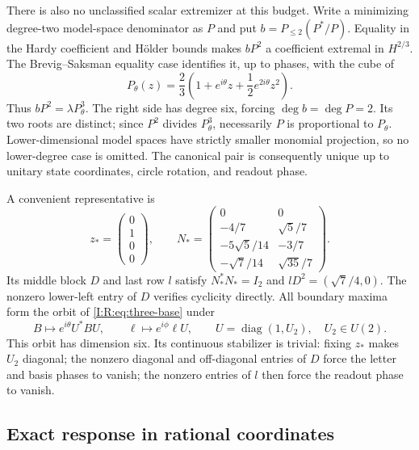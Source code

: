 There is also no unclassified scalar extremizer at this budget.
Write a minimizing degree-two model-space denominator as $P$ and put
$b=P_{\le2}(P^*/P)$.  Equality in the Hardy coefficient and H\"older
bounds makes $bP^2$ a coefficient extremal in $H^{2/3}$.
The Brevig--Saksman equality case identifies it, up to phases, with the
cube of
\[
 P_\theta(z)=\frac23\left(1+e^{i\theta}z+
                 \frac12 e^{2i\theta}z^2\right).
\]
Thus $bP^2=\lambda P_\theta^3$.
The right side has degree six, forcing $\deg b=\deg P=2$.
Its two roots are distinct; since $P^2$ divides $P_\theta^3$, necessarily
$P$ is proportional to $P_\theta$.
Lower-dimensional model spaces have strictly smaller monomial projection,
so no lower-degree case is omitted.
The canonical pair is consequently unique up to unitary state coordinates,
circle rotation, and readout phase.

A convenient representative is
\begin{equation}
 z_*=\begin{pmatrix}0\\1\\0\\0\end{pmatrix},\qquad
 N_*=
 \begin{pmatrix}
 0&0\\
 -4/7&\sqrt5/7\\
 -5\sqrt5/14&-3/7\\
 -\sqrt7/14&\sqrt{35}/7
 \end{pmatrix}.
 \label{I:R:eq:three-base}
\end{equation}
Its middle block $D$ and last row $l$ satisfy
$N_*^*N_*=I_2$ and $lD^2=(\sqrt7/4,0)$.
The nonzero lower-left entry of $D$ verifies cyclicity directly.
All boundary maxima form the orbit of \eqref{I:R:eq:three-base} under
\[
 B\mapsto e^{i\theta}U^*BU,\qquad
 \ell\mapsto e^{i\phi}\ell U,\qquad
 U=\operatorname{diag}(1,U_2),\quad U_2\in U(2).
\]
This orbit has dimension six.  Its continuous stabilizer is trivial:
fixing $z_*$ makes $U_2$ diagonal; the nonzero diagonal and off-diagonal
entries of $D$ force the letter and basis phases to vanish; the nonzero
entries of $l$ then force the readout phase to vanish.

\subsection{Exact response in rational coordinates}

